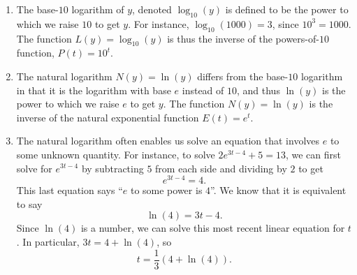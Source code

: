\documentclass[nooutcomes]{ximera}
\begin{document}
%
%
%

\begin{summary}
\begin{enumerate}
\item
The base-\(10\) logarithm of \(y\), denoted \(\log_{10}(y)\) is defined to be the power to which we raise \(10\)  to get \(y\).  For instance, \(\log_{10}(1000) = 3\), since \(10^3 = 1000\).  The function \(L(y) = \log_{10}(y)\) is thus the inverse of the powers-of-\(10\) function, \(P(t) = 10^t\).%
\item
The natural logarithm \(N(y) = \ln(y)\)  differs from the base-\(10\) logarithm in that it is the logarithm with base \(e\) instead of \(10\), and thus \(\ln(y)\) is the power to which we raise \(e\) to get \(y\).  The function \(N(y) = \ln(y)\) is the inverse of the natural exponential function \(E(t) = e^t\).%
\item
The natural logarithm often enables us solve an equation that involves \(e\) to some unknown quantity.  For instance, to solve \(2e^{3t-4} + 5 = 13\), we can first solve for \(e^{3t-4}\) by subtracting \(5\) from each side and dividing by \(2\) to get%
\begin{equation*}
e^{3t-4} = 4\text{.}
\end{equation*}
This last equation says ``\(e\) to some power is \(4\)''.  We know that it is equivalent to say%
\begin{equation*}
\ln(4) = 3t-4\text{.}
\end{equation*}
Since \(\ln(4)\) is a number, we can solve this most recent linear equation for \(t\).  In particular, \(3t = 4 + \ln(4)\), so%
\begin{equation*}
t = \frac{1}{3}(4 + \ln(4))\text{.}
\end{equation*}
%
\end{enumerate}
\end{summary}
\end{document}
